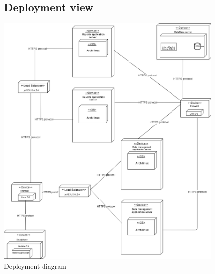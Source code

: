 \documentclass[titlepage]{article}
\begin{document}
\begin{figure}[h]
	\subsection{Deployment view}
	\includegraphics[scale=0.465]{Diagrams/Deployment diagram.png}
	\caption{Deployment diagram}
\end{figure}
\FloatBarrier
\end{document}

